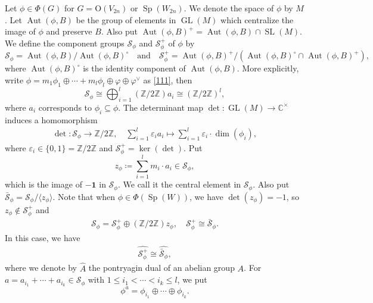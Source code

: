 \documentclass[article]{article}
\numberwithin{equation}{section}
\theoremstyle{definition}
\DeclareMathOperator{\Aut}{Aut}
\DeclareMathOperator{\GL}{GL}
\DeclareMathOperator{\SL}{SL}
\DeclareMathOperator{\SP}{Sp}
\begin{document}
Let $\phi\in \Phi(G)$ for $G=\mathrm O(V_{2n})$ or $\SP(W_{2n})$. We denote the space of $\phi$ by $M$. Let $\Aut(\phi,B)$ be the group of elements in $\GL(M)$ which centralize the image of $\phi$ and preserve $B$. Also put $\Aut(\phi,B)^+= \Aut(\phi,B)\cap \SL(M)$. We define the component groups $\mathcal {S}_{\phi}$ and $\mathcal {S}_{\phi}^+$ of $\phi$ by 
$$
\mathcal {S}_{\phi}=\Aut(\phi,B)/\Aut(\phi,B)^{\circ}\quad \mbox{and}\quad \mathcal {S}_{\phi}^+=\Aut(\phi,B)^+/\left(\Aut(\phi,B)^{\circ}\cap \Aut(\phi,B)^{+}\right),
$$
where $\Aut(\phi,B)^{\circ}$ is the identity component of $\Aut(\phi,B)$. More explicitly, write $\phi=m_{1} \phi_{1}\oplus\cdots+m_{l} \phi_{l}\oplus \varphi\oplus \varphi^{\vee}$ as \ref{111}, then 
$$\mathcal {S}_{\phi}\cong \bigoplus_{i=1}^{l}(\mathbb{Z} / 2 \mathbb{Z}) a_{i} \cong (\mathbb{Z} / 2 \mathbb{Z})^l,$$
where $a_i$ corresponds to $\phi_i\subseteq \phi$. The determinant map $\det: \GL(M) \rightarrow \mathbb{C}^{ \times}$ induces a homomorphism
\begin{equation}\label{detmap}
\begin{aligned}
\det : \mathcal {S}_{\phi} \rightarrow \mathbb{Z} / 2 \mathbb{Z},  \quad \sum_{i=1}^{l} \varepsilon_{i} a_{i} \mapsto \sum_{i=1}^{l} \varepsilon_{i} \cdot \dim\left(\phi_{i}\right),
\end{aligned}
\end{equation}
where $\varepsilon_{i} \in\{0,1\}=\mathbb Z/2\mathbb Z$ and $\mathcal {S}_{\phi}^+=\ker(\det)$. Put
$$z_{\phi} \coloneqq\sum_{i=1}^{l} m_i \cdot a_{i} \in \mathcal {S}_{\phi},$$ 
which is the image of $-\mathbf 1$ in $\mathcal S_\phi$. We call it the central element in $\mathcal {S}_{\phi}$. Also put $\bar {\mathcal {S}}_{\phi}=\mathcal {S}_{\phi}/\langle z_{\phi}\rangle$. Note that when $\phi\in \Phi(\SP(W))$, we have $\det(z_\phi)=-1$, so $z_\phi\notin \mathcal {S}_{\phi}^+$ and 
\begin{align*}
\mathcal S_\phi =\mathcal S_\phi^+\oplus (\mathbb Z/2\mathbb Z)z_\phi,\quad \mathcal S_\phi^+\cong \bar {\mathcal S}_\phi.
\end{align*}
In this case, we have  
\begin{align}\label{componentgroupsmall}
\widehat{\mathcal S^+_\phi}\cong \widehat{\bar {\mathcal {S}}_{\phi}}, 
\end{align}
where we denote by $\widehat{A}$ the pontryagin dual of an abelian group $A$. For $a=a_{i_{1}}+\cdots+a_{i_{k}} \in \mathcal {S}_{\phi}$ with $1 \leq i_{1}<\cdots<i_{k} \leq l$, we put
$$\phi^{a}=\phi_{i_{1}} \oplus \cdots \oplus \phi_{i_{k}}.$$
\end{document}
